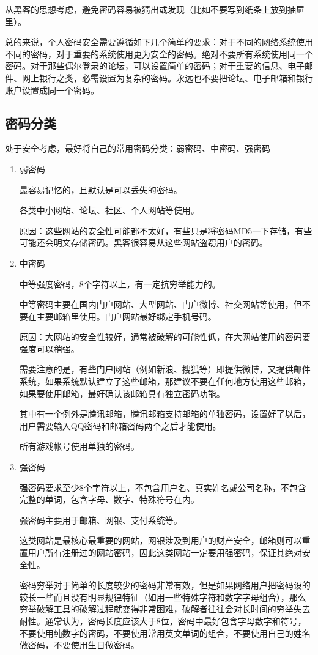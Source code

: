     从黑客的思想考虑，避免密码容易被猜出或发现（比如不要写到纸条上放到抽屉里）。

    总的来说，个人密码安全需要遵循如下几个简单的要求：对于不同的网络系统使用不同的密码，对于重要的系统使用更为安全的密码。绝对不要所有系统使用同一个密码。对于那些偶尔登录的论坛，可以设置简单的密码；对于重要的信息、电子邮件、网上银行之类，必需设置为复杂的密码。永远也不要把论坛、电子邮箱和银行账户设置成同一个密码。

\subsection {密码分类}

    处于安全考虑，最好将自己的常用密码分类：弱密码、中密码、强密码

    \begin{enumerate}
        \item 弱密码

        最容易记忆的，且默认是可以丢失的密码。

        各类中小网站、论坛、社区、个人网站等使用。

        原因：这些网站的安全性可能都不太好，有些只是将密码MD5一下存储，有些可能还会明文存储密码。黑客很容易从这些网站盗窃用户的密码。

        \item 中密码

        中等强度密码，8个字符以上，有一定抗穷举能力的。

        中等密码主要在国内门户网站、大型网站、门户微博、社交网站等使用，但不要在主要邮箱里使用。门户网站最好绑定手机号码。

        原因：大网站的安全性较好，通常被破解的可能性低，在大网站使用的密码要强度可以稍强。

        需要注意的是，有些门户网站（例如新浪、搜狐等）即提供微博，又提供邮件系统，如果系统默认建立了这些邮箱，那建议不要在任何地方使用这些邮箱，如果要使用邮箱，最好确认该邮箱具有独立密码功能。

        其中有一个例外是腾讯邮箱，腾讯邮箱支持邮箱的单独密码，设置好了以后，用户需要输入QQ密码和邮箱密码两个之后才能使用。

        所有游戏帐号使用单独的密码。

        \item 强密码

        强密码要求至少8个字符以上，不包含用户名、真实姓名或公司名称，不包含完整的单词，包含字母、数字、特殊符号在内。

        强密码主要用于邮箱、网银、支付系统等。

        这类网站是最核心最重要的网站，网银涉及到用户的财产安全，邮箱则可以重置用户所有注册过的网站密码，因此这类网站一定要用强密码，保证其绝对安全性。

        密码穷举对于简单的长度较少的密码非常有效，但是如果网络用户把密码设的较长一些而且没有明显规律特征（如用一些特殊字符和数字字母组合），那么穷举破解工具的破解过程就变得非常困难，破解者往往会对长时间的穷举失去耐性。通常认为，密码长度应该大于8位，密码中最好包含字母数字和符号，不要使用纯数字的密码，不要使用常用英文单词的组合，不要使用自己的姓名做密码，不要使用生日做密码。
    \end{enumerate}
